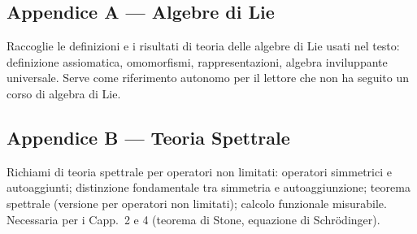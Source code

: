 \documentclass[12pt, a4paper]{article}
\begin{document}
	\subsection*{Appendice A --- Algebre di Lie}
	
	Raccoglie le definizioni e i risultati di teoria delle algebre di Lie usati nel testo:
	definizione assiomatica, omomorfismi, rappresentazioni, algebra inviluppante universale.
	Serve come riferimento autonomo per il lettore che non ha seguito un corso di algebra
	di Lie.
	
	\subsection*{Appendice B --- Teoria Spettrale}
	
	Richiami di teoria spettrale per operatori non limitati: operatori simmetrici e
	autoaggiunti; distinzione fondamentale tra simmetria e autoaggiunzione; teorema
	spettrale (versione per operatori non limitati); calcolo funzionale misurabile.
	Necessaria per i Capp.\ 2 e 4 (teorema di Stone, equazione di Schrödinger).
	
	
\end{document}
